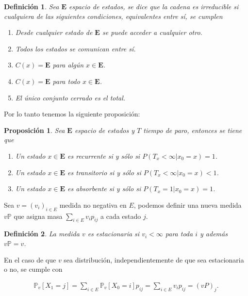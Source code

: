 \documentclass{article}
\newtheorem{Def}{Definición}[section]
\newtheorem{Prop}{Proposición}[section]
\newcommand{\Eb}{\mathbf{E}}
\newcommand{\prob}{\mathbb{P}}
\numberwithin{equation}{section}
\begin{document}
\begin{Def}
Sea $\Eb$ espacio de estados, se dice que la cadena es irreducible si cualquiera de las siguientes condiciones, equivalentes entre s\'i,  se cumplen
\begin{enumerate}
\item[a) ] Desde cualquier estado de $\Eb$ se puede acceder a cualquier otro.

\item[b) ] Todos los estados se comunican entre s\'i.

\item[c) ] $C\left(x\right)=\Eb$ para alg\'un $x\in\Eb$.

\item[d) ] $C\left(x\right)=\Eb$ para todo $x\in\Eb$.

\item[e) ] El \'unico conjunto cerrado es el total.
\end{enumerate}
\end{Def}
Por lo tanto tenemos la siguiente proposici\'on:
\begin{Prop}  Sea $\Eb$ espacio de estados y $T$ tiempo de paro, entonces se tiene que
\begin{enumerate}
\item[a) ] Un estado $x\in\Eb$ es recurrente si y s\'olo si $P\left(T_{x}<\infty|x_{0}=x\right)=1$.

\item[b) ] Un estado $x\in\Eb$ es transitorio si y s\'olo si $P\left(T_{x}<\infty|x_{0}=x\right)<1$.

\item[c) ] Un estado $x\in\Eb$ es absorbente si y s\'olo si $P\left(T_{x}=1|x_{0}=x\right)=1$.


\end{enumerate}
\end{Prop}

Sea $v=\left(v_{i}\right)_{i\in E}$ medida no negativa en $E$, podemos definir una nueva medida $v\prob$ que asigna masa $\sum_{i\in E}v_{i}p_{ij}$ a cada estado $j$.

\begin{Def}
La medida $v$ es estacionaria si $v_{i}<\infty$ para toda $i$ y adem\'as $v\prob=v$.
\end{Def}
En el caso de que $v$ sea distribuci\'on, independientemente de que sea estacionaria o no, se cumple con

\begin{eqnarray}
\prob_{v}\left[X_{1}=j\right]=\sum_{i\in E}\prob_{v}\left[X_{0}=i\right]p_{ij}=\sum_{i\in E}v_{i}p_{ij}=\left(vP\right)_{j}.
\end{eqnarray}
\end{document}
